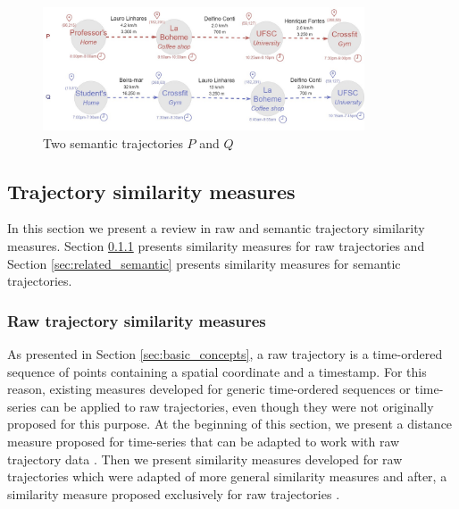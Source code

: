 \documentclass[12pt]{article}
\begin{document}
\begin{figure}[h]
\centering
\includegraphics[width=0.85\textwidth]{Related_Works/Semantic_trajectories.jpg}
\caption{\label{fig:related_semantic_trajes}Two semantic trajectories $P$ and $Q$}
\end{figure}

\subsection{Trajectory similarity measures} \label{sec:related_measures}

{In this section we present a review in raw and semantic trajectory similarity measures. Section {\ref{sec:related_raw}} presents similarity measures for raw trajectories and Section {\ref{sec:related_semantic}} presents similarity measures for semantic trajectories.}

\subsubsection{Raw trajectory similarity measures} \label{sec:related_raw}
{As presented in Section {\ref{sec:basic_concepts},} a raw trajectory is a time-ordered sequence of points containing a spatial coordinate and a timestamp. For this reason, existing measures developed for generic time-ordered sequences or time-series can be applied to raw trajectories, even though they were not originally proposed for this purpose. At the beginning of this section, we present a distance measure proposed for time-series }\cite{berndt1994using}{ that can be adapted to work with raw trajectory data }\cite{ten2007multi}{. Then we present similarity measures developed for raw trajectories which were adapted of more general similarity measures }\cite{eiter1994computing, Ding:2008:ESJ:1440463.1440989, vlachos2002discovering, Chen:2004:MLE:1316689.1316758, Chen:2005:RFS:1066157.1066213}{ and after, a similarity measure proposed exclusively for raw trajectories }\cite{Furtado-UMS-2018}.

\end{document}
